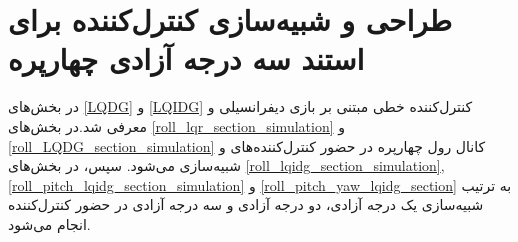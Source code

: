 \chapter{طراحی و شبیه‌سازی کنترل‌کننده برای استند سه درجه آزادی چهارپره}\label{MIL}
در بخش‌های
\ref{LQDG}
و
\ref{LQIDG}
کنترل‌کننده خطی مبتنی بر بازی دیفرانسیلی  و  معرفی شد.در بخش‌های
\ref{roll_lqr_section_simulation}
و
\ref{roll_LQDG_section_simulation}
کانال 	رول چهارپره در حضور کنترل‌کننده‌های  و
شبیه‌سازی می‌شود. سپس، در بخش‌های
\ref{roll_lqidg_section_simulation},
\ref{roll_pitch_lqidg_section_simulation}
و
\ref{roll_pitch_yaw_lqidg_section}
به‌ ترتیب شبیه‌سازی یک درجه آزادی، دو درجه آزادی و سه درجه آزادی در حضور کنترل‌کننده‌  انجام می‌شود.
